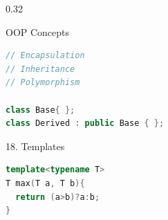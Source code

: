 \documentclass[final]{beamer}
\begin{document}
\begin{frame}[t,fragile]
\begin{columns}[t,totalwidth=\paperwidth, colsep=0.015\paperwidth]
\begin{column}{0.32\paperwidth}
\begin{block}{OOP Concepts}
\begin{lstlisting}[language=C++]
// Encapsulation
// Inheritance
// Polymorphism

class Base{ };
class Derived : public Base { };
\end{lstlisting}
\end{block}

\begin{block}{18. Templates}
\begin{lstlisting}[language=C++]
template<typename T>
T max(T a, T b){
  return (a>b)?a:b;
}
\end{lstlisting}
\end{block}
\end{column}
\end{columns}
\end{frame}
\end{document}
